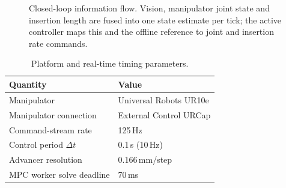 \documentclass[journal]{IEEEtran}
\begin{document}
\begin{figure}[t]
\centering
{}
\caption{Closed-loop information flow. Vision, manipulator joint state and
insertion length are fused into one state estimate per tick; the active
controller maps this and the offline reference to joint and insertion
rate commands.}
\label{fig:architecture}
\end{figure}

\begin{table}[t]
\centering
\caption{Platform and real-time timing parameters.}
\label{tab:hardware}
\small
\begin{tabular}{@{}ll@{}}
\toprule
Quantity & Value \\
\midrule
Manipulator & Universal Robots UR10e \\
Manipulator connection & External Control URCap \\
Command-stream rate & 125\,Hz \\ %
Control period $\Delta t$ & 0.1\,s (10\,Hz) \\
Advancer resolution & 0.166\,mm/step \\
MPC worker solve deadline & 70\,ms \\
\bottomrule
\end{tabular}
\end{table}
\end{document}
